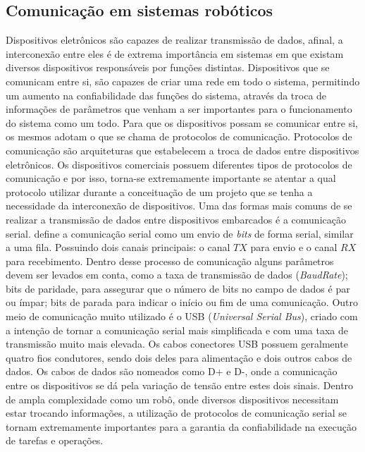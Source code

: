 \subsection{Comunicação em sistemas robóticos}\label{sec:comm_sis}
Dispositivos eletrônicos são capazes de realizar transmissão de dados, afinal, a interconexão entre eles é de extrema importância em sistemas em que existam diversos dispositivos responsáveis por funções distintas. Dispositivos que se comunicam entre si, são capazes de criar uma rede em todo o sistema, permitindo um aumento na confiabilidade das funções do sistema, através da troca de informações de parâmetros que venham a ser importantes para o funcionamento do sistema como um todo.
Para que os dispositivos possam se comunicar entre si, os mesmos adotam o que se chama de protocolos de comunicação. Protocolos de comunicação são arquiteturas que estabelecem a troca de dados entre dispositivos eletrônicos. Os dispositivos comerciais possuem diferentes tipos de protocolos de comunicação e por isso, torna-se extremamente importante se atentar a qual protocolo utilizar durante a conceituação de um projeto que se tenha a necessidade da interconexão de dispositivos.
Uma das formas mais comuns de se realizar a transmissão de dados entre dispositivos embarcados é a comunicação serial. \cite{livro_sistemas_embarcados} define a comunicação serial como um envio de \textit{bits} de forma serial, similar a uma fila. Possuindo dois canais principais: o canal $TX$ para envio e o canal $RX$ para recebimento. Dentro desse processo de comunicação alguns parâmetros devem ser levados em conta, como a taxa de transmissão de dados (\textit{BaudRate}); bits de paridade, para assegurar que o número de bits no campo de dados é par ou ímpar; bits de parada para indicar o início ou fim de uma comunicação.
Outro meio de comunicação muito utilizado é o USB (\textit{Universal Serial Bus}), criado com a intenção de tornar a comunicação serial mais simplificada e com uma taxa de transmissão muito mais elevada. Os cabos conectores USB possuem geralmente quatro fios condutores, sendo dois deles para alimentação e dois outros cabos de dados. Os cabos de dados são nomeados como D+ e D-, onde a comunicação entre os dispositivos se dá pela variação de tensão entre estes dois sinais.
Dentro de ampla complexidade como um robô, onde diversos dispositivos necessitam estar trocando informações, a utilização de protocolos de comunicação serial se tornam extremamente importantes para a garantia da confiabilidade na execução de tarefas e operações.
